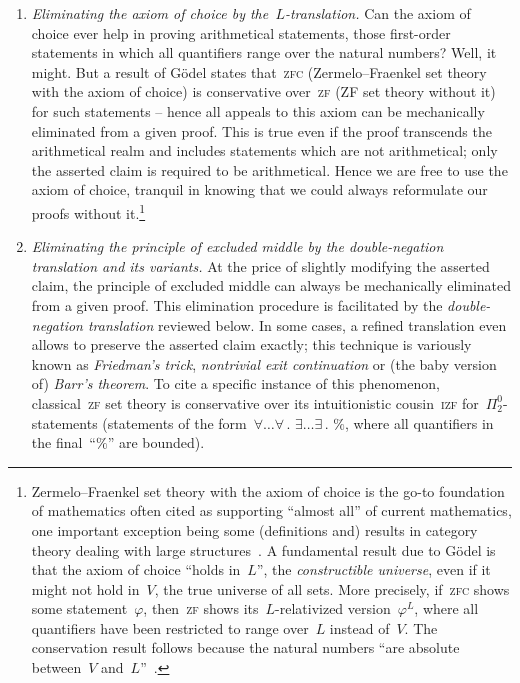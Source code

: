 \documentclass[10pt,reqno,a4paper,openany]{amsbook}
\theoremstyle{definition}
\theoremstyle{plain}
\theoremstyle{remark}
\newcommand{\?}{\,{:}\,}
\renewcommand{\_}{\mathpunct{.}\,}
\begin{document}
\begin{enumerate}
\item \emph{Eliminating the axiom of choice by the~$L$-translation.} Can the
axiom of choice ever help in proving arithmetical statements, those first-order
statements in which all quantifiers range over the natural numbers? Well, it
might. But a result of Gödel states that~\textsc{zfc} (Zermelo--Fraenkel set
theory with the axiom of choice) is conservative over~\textsc{zf} (ZF set
theory without it) for such statements -- hence all appeals to this axiom can
be mechanically eliminated from a given proof. This is true even if the proof
transcends the arithmetical realm and includes statements which are not
arithmetical; only the asserted claim is required to be arithmetical. Hence we
are free to use the axiom of choice, tranquil in knowing that we could always
reformulate our proofs without it.\footnote{Zermelo--Fraenkel set theory with
the axiom of choice is the go-to foundation of mathematics often cited as
supporting ``almost all'' of current mathematics, one important exception being
some (definitions and) results in category theory dealing with large
structures~\cite{shulman:set-theory,feferman:set-foundations}. A fundamental
result due to Gödel is that the axiom of choice ``holds in~$L$'', the
\emph{constructible universe}, even if it might not hold in~$V$, the true
universe of all sets. More precisely, if~\textsc{zfc} shows some
statement~$\varphi$, then~\textsc{zf} shows its~$L$-relativized
version~$\varphi^L$, where all quantifiers have been restricted to range
over~$L$ instead of~$V$. The conservation result follows because the natural
numbers ``are absolute between~$V$
and~$L$''~\cite{goedel:ac-gch,schoenfield:predicativity}.}

\item \emph{Eliminating the principle of excluded middle by the double-negation
translation and its variants.} At the price of
slightly modifying the asserted claim, the principle of excluded middle
can always be mechanically eliminated from a given proof. This
elimination procedure is facilitated by the \emph{double-negation translation}
reviewed below. In some cases, a refined translation even allows to preserve the asserted
claim exactly; this technique is variously known as \emph{Friedman's trick},
\emph{nontrivial exit continuation} or (the baby version of) \emph{Barr's
theorem}. To cite a specific instance of this phenomenon, classical~\textsc{zf}
set theory is conservative over its intuitionistic cousin~\textsc{izf}
for~$\Pi^0_2$-statements (statements of the form~$\forall\ldots\forall\_
\exists\ldots\exists\_ \%$, where all quantifiers in the final~``$\%$''
are bounded).


\end{enumerate}
\end{document}
